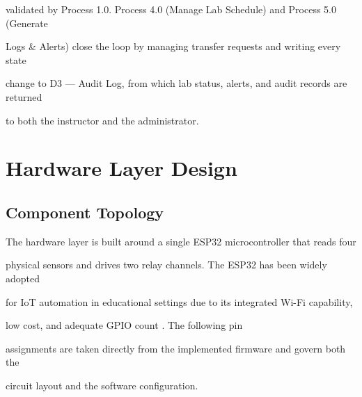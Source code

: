 validated by Process 1.0. Process 4.0 (Manage Lab Schedule) and Process 5.0 (Generate

Logs \& Alerts) close the loop by managing transfer requests and writing every state

change to D3 --- Audit Log, from which lab status, alerts, and audit records are returned

to both the instructor and the administrator.


\section{Hardware Layer Design}

\subsection{Component Topology}
The hardware layer is built around a single ESP32 microcontroller that reads four

physical sensors and drives two relay channels. The ESP32 has been widely adopted

for IoT automation in educational settings due to its integrated Wi-Fi capability,

low cost, and adequate GPIO count \cite{marhoon2018,rao2021}. The following pin

assignments are taken directly from the implemented firmware and govern both the

circuit layout and the software configuration.


